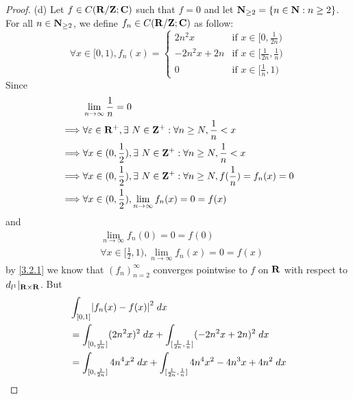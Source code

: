 \begin{proof}{(d)}
  Let \(f \in C(\mathbf{R} / \mathbf{Z} ; \mathbf{C})\) such that \(f = 0\) and let \(\mathbf{N}_{\geq 2} = \{n \in \mathbf{N} : n \geq 2\}\).
  For all \(n \in \mathbf{N}_{\geq 2}\), we define \(f_n \in C(\mathbf{R} / \mathbf{Z} ; \mathbf{C})\) as follow:
  \[
    \forall x \in [0, 1), f_n(x) = \begin{cases}
      2 n^2 x       & \text{if } x \in [0, \frac{1}{2n})           \\
      -2 n^2 x + 2n & \text{if } x \in [\frac{1}{2n}, \frac{1}{n}) \\
      0             & \text{if } x \in [\frac{1}{n}, 1)
    \end{cases}
  \]
  Since
  \begin{align*}
             & \lim_{n \to \infty} \frac{1}{n} = 0                                                                 \\
    \implies & \forall \varepsilon \in \mathbf{R}^+, \exists\ N \in \mathbf{Z}^+ : \forall n \geq N, \frac{1}{n} < x               \\
    \implies & \forall x \in (0, \frac{1}{2}), \exists\ N \in \mathbf{Z}^+ : \forall n \geq N, \frac{1}{n} < x             \\
    \implies & \forall x \in (0, \frac{1}{2}), \exists\ N \in \mathbf{Z}^+ : \forall n \geq N, f(\frac{1}{n}) = f_n(x) = 0 \\
    \implies & \forall x \in (0, \frac{1}{2}), \lim_{n \to \infty} f_n(x) = 0 = f(x)
  \end{align*}
  and
  \begin{align*}
     & \lim_{n \to \infty} f_n(0) = 0 = f(0)                                 \\
     & \forall x \in [\frac{1}{2}, 1), \lim_{n \to \infty} f_n(x) = 0 = f(x)
  \end{align*}
  by \cref{3.2.1} we know that \((f_n)_{n = 2}^\infty\) converges pointwise to \(f\) on \(\mathbf{R}\) with respect to \(d_{l^1}|_{\mathbf{R} \times \mathbf{R}}\).
  But
  \begin{align*}
     & \int_{[0, 1]} \abs{f_n(x) - f(x)}^2 \; dx                                                                                                              \\
     & = \int_{[0, \frac{1}{2n}]} (2 n^2 x)^2 \; dx + \int_{[\frac{1}{2n}, \frac{1}{n}]} (-2n^2 x + 2n)^2 \; dx                                               \\
     & = \int_{[0, \frac{1}{2n}]} 4 n^4 x^2 \; dx + \int_{[\frac{1}{2n}, \frac{1}{n}]} 4 n^4 x^2 - 4 n^3 x + 4n^2 \; dx                                       \\

\end{align*}
\end{proof}
